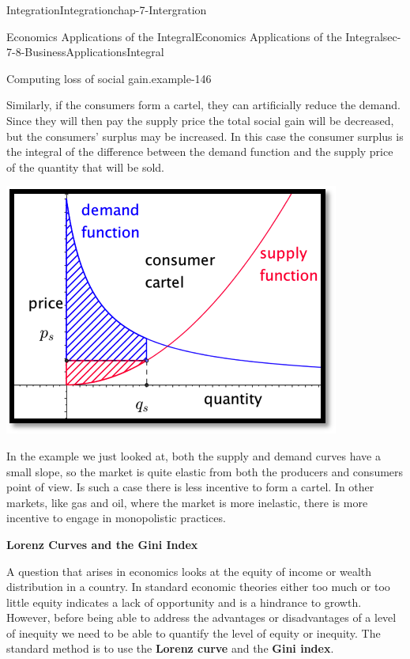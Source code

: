 \documentclass[oneside,10pt,]{book}
\newcommand{\terminology}[1]{\textbf{#1}}
\numberwithin{equation}{section}
\begin{document}
\begin{chapterptx}{Integration}{}{Integration}{}{}{chap-7-Intergration}
\begin{sectionptx}{Economics Applications of the Integral}{}{Economics Applications of the Integral}{}{}{sec-7-8-BusinessApplicationsIntegral}
\begin{example}{Computing loss of social gain.}{example-146}
\end{example}
\hypertarget{p-3107}{}%
Similarly, if the consumers form a cartel, they can artificially reduce the demand.  Since they will then pay the supply price the total social gain will be decreased, but the consumers’ surplus may be increased.  In this case the consumer surplus is the integral of the difference between the demand function and the supply price of the quantity that will be sold.%
\begin{sidebyside}{1}{0.2}{0.2}{0}%
\begin{sbspanel}{0.6}%
\includegraphics[width=1\linewidth]{images/sec7-8-14.png}
\end{sbspanel}%
\end{sidebyside}%
\par
\hypertarget{p-3108}{}%
In the example we just looked at, both the supply and demand curves have a small slope, so the market is quite elastic from both the producers and consumers point of view.  Is such a case there is less incentive to form a cartel.  In other markets, like gas and oil, where the market is more inelastic, there is more incentive to engage in monopolistic practices.%
\par
\hypertarget{p-3109}{}%
\terminology{Lorenz Curves and the Gini Index}%
\par
\hypertarget{p-3110}{}%
A question that arises in economics looks at the equity of income or wealth distribution in a country.  In standard economic theories either too much or too little equity indicates a lack of opportunity and is a hindrance to growth.  However, before being able to address the advantages or disadvantages of a level of inequity we need to be able to quantify the level of equity or inequity.  The standard method is to use the \terminology{Lorenz curve} and the \terminology{Gini index}.%

\end{sectionptx}
\end{chapterptx}
\end{document}
